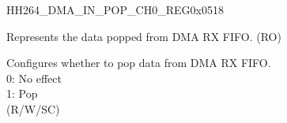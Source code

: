     
    \begin{register}{H}{H264\_DMA\_IN\_POP\_CH0\_REG}{0x0518}\label{regdesc:H264DMAINPOPCH0REG}
    \regnewline%
    \begin{regdesc}\begin{reglist}
    \label{fielddesc:H264DMAINFIFORDATACH0}\item [H264\_DMA\_INFIFO\_RDATA\_CH0] Represents the data popped from DMA RX FIFO. (RO)
    \label{fielddesc:H264DMAINFIFOPOPCH0}\item [H264\_DMA\_INFIFO\_POP\_CH0] Configures whether to pop data from DMA RX FIFO.\\
    0: No effect\\
    1: Pop\\ (R/W/SC)
    \end{reglist}\end{regdesc}
    \end{register}
    
